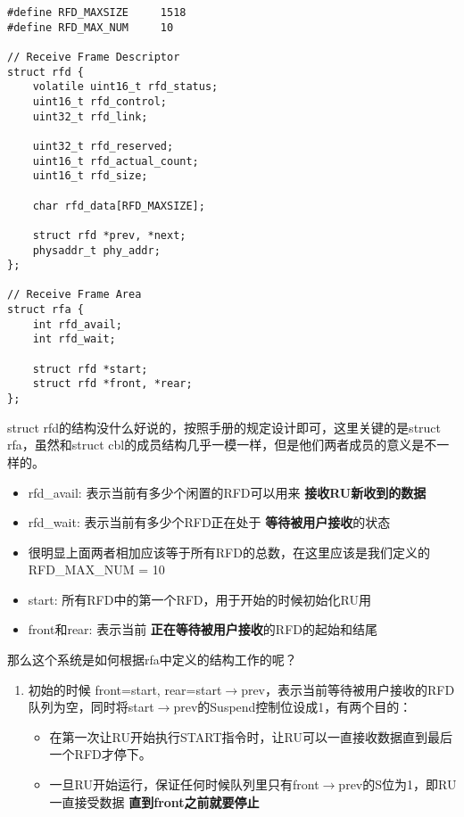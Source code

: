 \documentclass{article}
\newcommand{\highlight}[1]{{\bfseries \color{red}  #1}}
\begin{document}
\begin{CJK*}{UTF8}{gkai}
\begin{lstlisting}[style=ccode, title={\scriptsize \ttfamily \bfseries kern/e100.h}]
#define RFD_MAXSIZE     1518
#define RFD_MAX_NUM     10

// Receive Frame Descriptor
struct rfd {
    volatile uint16_t rfd_status;
    uint16_t rfd_control;
    uint32_t rfd_link;

    uint32_t rfd_reserved;
    uint16_t rfd_actual_count;
    uint16_t rfd_size;

    char rfd_data[RFD_MAXSIZE];

    struct rfd *prev, *next;
    physaddr_t phy_addr;   
};

// Receive Frame Area
struct rfa {
    int rfd_avail;
    int rfd_wait;

    struct rfd *start;
    struct rfd *front, *rear;
};
\end{lstlisting}


struct rfd的结构没什么好说的，按照手册的规定设计即可，这里关键的是struct rfa，虽然和struct cbl的成员结构几乎一模一样，但是他们两者成员的意义是不一样的。

\begin{itemize}
\item{rfd\_avail: 表示当前有多少个闲置的RFD可以用来\highlight{接收RU新收到的数据}}
\item{rfd\_wait: 表示当前有多少个RFD正在处于\highlight{等待被用户接收}的状态}
\item{很明显上面两者相加应该等于所有RFD的总数，在这里应该是我们定义的RFD\_MAX\_NUM = 10}
\item{start: 所有RFD中的第一个RFD，用于开始的时候初始化RU用}
\item{front和rear: 表示当前\highlight{正在等待被用户接收}的RFD的起始和结尾}

\end{itemize}


那么这个系统是如何根据rfa中定义的结构工作的呢？

\begin{enumerate}
\item{初始的时候 front=start, rear=start$\rightarrow$prev，表示当前等待被用户接收的RFD队列为空，同时将start$\rightarrow$prev的Suspend控制位设成1，有两个目的：

\begin{itemize}

\item{在第一次让RU开始执行START指令时，让RU可以一直接收数据直到最后一个RFD才停下。}
\item{一旦RU开始运行，保证任何时候队列里只有front$\rightarrow$prev的S位为1，即RU一直接受数据\highlight{直到front之前就要停止}}
\end{itemize}

}
\end{enumerate}
\end{CJK*}
\end{document}
